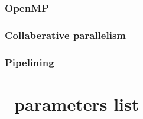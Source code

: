 \documentclass{book}
\begin{document}
\subsection{OpenMP}

\subsection{Collaberative parallelism}

\subsection{Pipelining}

\appendix
\newcommand{\parametersize}{\scriptsize}

\chapter{\enzo\ parameters list}
\end{document}

